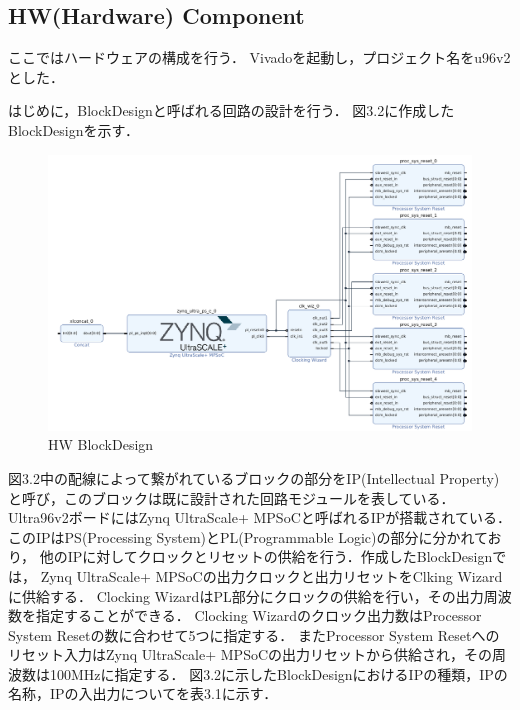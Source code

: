 \documentclass[11pt,a4j]{jreport}
\begin{document}
\subsection{HW(Hardware) Component}
ここではハードウェアの構成を行う．
Vivadoを起動し，プロジェクト名をu96v2とした．

はじめに，BlockDesign\cite{BD}と呼ばれる回路の設計を行う．
図3.2に作成したBlockDesignを示す．
\begin{figure}[H]
  \center
  \includegraphics[scale = 0.4]{pict/pict2.jpg}
  \caption{HW BlockDesign}
\end{figure}
図3.2中の配線によって繋がれているブロックの部分をIP(Intellectual Property)
と呼び，このブロックは既に設計された回路モジュールを表している．
Ultra96v2ボードにはZynq UltraScale+ MPSoCと呼ばれるIPが搭載されている．
このIPはPS(Processing System)とPL(Programmable Logic)の部分に分かれており，
他のIPに対してクロックとリセットの供給を行う．作成したBlockDesignでは，
Zynq UltraScale+ MPSoCの出力クロックと出力リセットをClking Wizardに供給する．
Clocking WizardはPL部分にクロックの供給を行い，その出力周波数を指定することができる．
Clocking Wizardのクロック出力数はProcessor System Resetの数に合わせて5つに指定する．
またProcessor System Resetへのリセット入力はZynq UltraScale+ MPSoCの出力リセットから供給され，その周波数は100MHzに指定する．
図3.2に示したBlockDesignにおけるIPの種類，IPの名称，IPの入出力についてを表3.1に示す．
\end{document}
